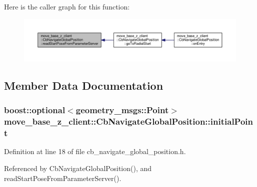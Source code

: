 Here is the caller graph for this function\+:\nopagebreak
\begin{figure}[H]
\begin{center}
\leavevmode
\includegraphics[width=350pt]{classmove__base__z__client_1_1CbNavigateGlobalPosition_a866ea02c9e25ac1df9df88272deb04b3_icgraph}
\end{center}
\end{figure}




\subsection{Member Data Documentation}
\subsubsection[{\texorpdfstring{initial\+Point}{initialPoint}}]{\setlength{\rightskip}{0pt plus 5cm}boost\+::optional$<$geometry\+\_\+msgs\+::\+Point$>$ move\+\_\+base\+\_\+z\+\_\+client\+::\+Cb\+Navigate\+Global\+Position\+::initial\+Point}\hypertarget{classmove__base__z__client_1_1CbNavigateGlobalPosition_a603d293ad4557e8332fcfd264d7075d4}{}\label{classmove__base__z__client_1_1CbNavigateGlobalPosition_a603d293ad4557e8332fcfd264d7075d4}


Definition at line 18 of file cb\+\_\+navigate\+\_\+global\+\_\+position.\+h.



Referenced by Cb\+Navigate\+Global\+Position(), and read\+Start\+Pose\+From\+Parameter\+Server().

